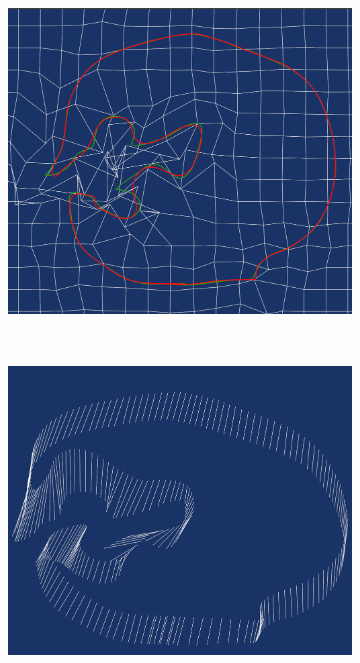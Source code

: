 \documentclass[3p,times]{elsarticle}
\begin{document}
\begin{figure}[ht]
\begin{subfigure}[b]{0.25\textwidth}
\includegraphics[width=\textwidth,height=0.15\textheight]{../picture/FFD_transformed_2_3.png}
\caption{}
\label{fig:FFD_transformed_2_3}
\end{subfigure}
~~~~~~~~~~~~~~~~~~~~~
\begin{subfigure}[b]{0.25\textwidth}
\includegraphics[width=\textwidth,height=0.15\textheight]{../picture/FFD_correspond_2_3.png}
\caption{}
\label{fig:FFD_correspond_2_3}

\end{subfigure}
\end{figure}
\end{document}
